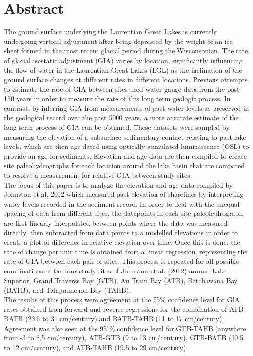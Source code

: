 


\newcommand{\result}[1]{%
    \dtlgetrowforvalue{result}{\dtlcolumnindex{result}{id}}{#1}%
}


\section{Abstract}

The ground surface underlying the Laurentian Great Lakes is currently undergoing vertical adjustment
 after being depressed by the weight of an ice sheet formed in the most recent glacial period during the Wisconsonian.
 The rate of glacial isostatic adjustment (GIA) varies by location, significantly influencing the flow of water
 in the Laurentian Great Lakes (LGL) as the inclination of the ground surface changes at different rates
 in different locations. Previous attempts to 
 estimate the rate of GIA between sites used water gauge data from the
 past 150 years in order to measure the rate of this long term geologic process. In contrast, by
 inferring GIA from measurements of past water levels as preserved in the geological record over the past 5000 years,
 a more accurate estimate of the long term process of GIA can be obtained. These
 datasets were sampled by measuring the elevation of a subsurface sedimentary contact relating to
 past lake levels, which are then age dated using optically stimulated luminescence
 (OSL) to provide an age for sediments. Elevation and age data are then compiled
 to create site paleohydrographs for each location around the lake basin that are
 compared to resolve a measurement for relative GIA between study sites.\\
 
 The focus of this paper is to analyze the elevation and age data compiled by Johnston et al, 2012
 which measured past elevation of shorelines by interpreting water levels recorded
 in the sediment record. In order to deal with the unequal spacing of data from
 different sites, the datapoints in each site paleohydrograph
 are first linearly interpolated between points where the data was measured directly, then subtracted
 from data points to a modelled elevations in order to create a
 plot of difference in relative elevation over time. Once this is done, the rate of change per unit
 time is obtained from a linear regression, representing the rate
 of GIA between each pair of sites. This process is repeated for
 all possible combinations of the four study sites of Johnston et al. (2012) around Lake Superior, 
 Grand Traverse Bay (GTB), Au Train Bay (ATB), Batchawana Bay (BATB), and Tahquamenon Bay (TAHB).\\
 
 
 
 The results of this process were agreement at the 95\% confidence level for GIA rates obtained from
 forward and reverse regressions for the combination of ATB-BATB (23.5 to 31 cm/century) and
 BATB-TAHB (11 to 17 cm/century). Agreement was also seen at the 95 \% confidence level for GTB-TAHB (anywhere from -3 to 8.5 cm/century),
 ATB-GTB (9 to 13 cm/century), GTB-BATB (10.5 to 12 cm/century), and ATB-TAHB (19.5 to 29 cm/century).
